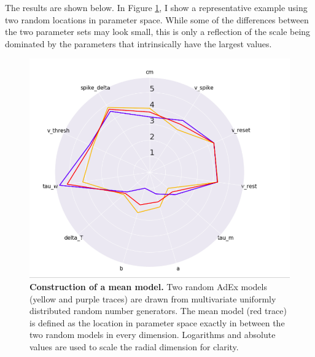 The results are shown below.
In Figure \ref{fig:mean-model-polar}, I show a representative example using two random locations in parameter space.
While some of the differences between the two parameter sets may look small, this is only a reflection of the scale being dominated by the parameters that intrinsically have the largest values.

\begin{figure}
\begin{center}
\includegraphics[]{figures/polar_coordinates.png}
\caption[Mean of Random Models]{\textbf{Construction of a mean model.}
Two random AdEx models (yellow and purple traces) are drawn from multivariate uniformly distributed random number generators.
The mean model (red trace) is defined as the location in parameter space exactly in between the two random models in every dimension.
Logarithms and absolute values are used to scale the radial dimension for clarity.}
\label{fig:mean-model-polar}
\end{center}
\end{figure}


